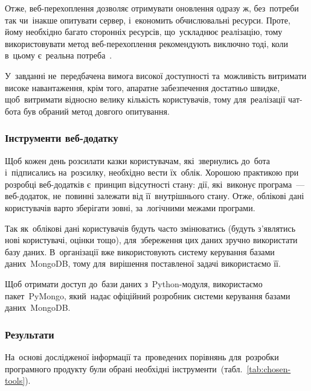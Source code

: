 \documentclass[
	a4paper,
	oneside,
	BCOR = 10mm,
	DIV = 12,
	12pt,
	headings = normal,
]{scrartcl}
\begin{document}
				Отже, веб-перехоплення дозволяє отримувати оновлення одразу ж, без~потреби так чи~інакше опитувати сервер, і~економить обчислювальні ресурси. Проте, йому необхідно багато сторонніх ресурсів, що~ускладнює реалізацію, тому використовувати метод веб-перехоплення рекомендують виключно тоді, коли в~цьому є~реальна потреба~\cite{ptb-longpoll-webhooks}.

				У~завданні не~передбачена вимога високої доступності та~можливість витримати високе навантаження, крім того, апаратне забезпечення достатньо швидке, щоб~витримати відносно велику кількість користувачів, тому для~реалізації чат-бота був обраний метод довгого опитування.

			\subsubsection{Інструменти веб-додатку}
				Щоб кожен день розсилати казки користувачам, які~звернулись до~бота і~підписались на~розсилку, необхідно вести їх~облік. Хорошою практикою при розробці веб-додатків є~принцип відсутності стану: дії, які~виконує програма~— веб-додаток, не~повинні залежати від її~внутрішнього стану. Отже, облікові дані користувачів варто зберігати зовні, за~логічними межами програми.

				Так як~облікові дані користувачів будуть часто змінюватись (будуть з'я\-вля\-тись нові користувачі, оцінки тощо), для~збереження цих даних зручно використати базу даних. В~організації вже використовують систему керування базами даних~\textenglish{MongoDB}, тому для~вирішення поставленої задачі використаємо її.

				Щоб отримати доступ до~бази даних з~\textenglish{Python}-модуля, використаємо пакет~\textenglish{PyMongo}, який~надає офіційний розробник системи керування базами даних~\textenglish{MongoDB}.

			\subsubsection{Результати}
				На~основі дослідженої інформації та~проведених порівнянь для~розробки програмного продукту були обрані необхідні інструменти~(табл.~\ref{tab:chosen-tools}).
\end{document}
